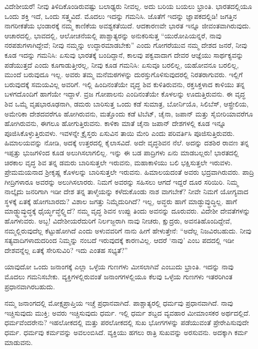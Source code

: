 ವಿದೇಶೀಯರೆ! ನೀವು ತಿಳಿದಿಕೊಂಡಿರುವಷ್ಟು ಬಲಾಢ್ಯರು ನೀವಲ್ಲ. ಅದು ಬರಿಯ ಬಯಲು ಭ್ರಾಂತಿ. ಭಾರತದಲ್ಲಿಯೂ ಒಂದು ಶಕ್ತಿ ಇದೆ, ಒಂದು ಸತ್ತ್ವವಿದೆ. ಮೊದಲು ಇದನ್ನು ಗಮನಿಸಿ. ಜೊತೆಗೆ ಇದನ್ನು ಜ್ಞಾಪಕದಲ್ಲಿಡಿ! ಜಗತ್ತಿನ ನಾಗರೀಕತೆಯ ಭಂಡಾರಕ್ಕೆ ನಮ್ಮ ಕಾಣಿಕೆಯ ಅವಶ್ಯಕತೆಯಿದೆ. ಆದಕಾರಣವೇ ಭಾರತ ಇನ್ನೂ ಜೀವಂತವಾಗಿರುವುದು. ಆಚಾರದಲ್ಲಿ, ಭಾವದಲ್ಲಿ, ಆಲೋಚನೆಯಲ್ಲಿ ಪಾಶ್ಚಾತ್ಯರನ್ನು ಅನುಕರಿಸುತ್ತ “ಯುರೋಪಿ\break ಯನ್ನರೆ, ನಾವು ನರಪಶುಗಳಾಗಿದ್ದೇವೆ; ನೀವು ನಮ್ಮನ್ನು ಉದ್ಧಾರಮಾಡಬೇಕು” ಎಂದು ಗೋಗರೆಯುವ ನಮ್ಮ ದೇಶದ ಜನರೆ, ನೀವು ಕೂಡ ಇದನ್ನು ಗಮನಿಸಿ: ಏಸುವು ಭಾರತಕ್ಕೆ ಬಂದಿದ್ದಾನೆ, ಕಾಲವು ಪಕ್ವವಾದಾಗ ದೇವರ ಆಜ್ಞೆಯು ಸಾರ್ಥಕ್ಯವನ್ನು ಪಡೆಯುತ್ತದೆ ಎಂದು ಕೂಗಾಡುತ್ತೀರಲ್ಲ, ನೀವು ಕೂಡ ಗಮನಿಸಿ: ಏಸುವೂ ಬರಲಿಲ್ಲ, ಯಹೋವನೂ ಬರಲಿಲ್ಲ, ಮುಂದೆ ಬರುವುದೂ ಇಲ್ಲ. ಅವರು ತಮ್ಮ ಮನೆಮಠಗಳನ್ನು ದುರಸ್ತುಗೊಳಿಸು\break ವುದರಲ್ಲಿ ನಿರತರಾಗುವರು. ಇಲ್ಲಿಗೆ ಬರುವುದಕ್ಕೆ ಸಮಯವಿಲ್ಲ ಅವರಿಗೆ. ಇಲ್ಲಿ ಹಿಂದಿನಂತೆಯೇ ವೃದ್ಧ ಶಿವ ಕುಳಿತಿರುವನು, ರಕ್ತಸಿಕ್ತಳಾದ ಕಾಳಿಯು ತನ್ನ ಬಳಗದೊಂದಿಗೆ ಹಾಗೆಯೇ ಇದ್ದಾಳೆ. ವ್ರಜ ಗೋಪಾಲನು ಎಂದಿನಂತೆಯೇ ಕೊಳಲನ್ನು ಊದುತ್ತಿರುವನು. ಈ ವೃದ್ಧ ಶಿವ ಒಮ್ಮೆ ವೃಷಭಾರೂಢನಾಗಿ, ಡಮರು ಬಾರಿಸುತ್ತ ಒಂದು ಕಡೆ ಸುಮಾತ್ರ, ಬೋರ್ನಿಯೊ, ಸಿಲಿಬೆಸ್​, ಆಸ್ಟ್ರೇಲಿಯ, ಅಮೇರಿಕಾ ದೇಶದವರೆಗೂ ಹೋಗಿರುವನು, ಮತ್ತೊಂದು ಕಡೆ ಟಿಬೆಟ್​, ಚೈನಾ, ಜಪಾನ್​ ಮತ್ತು ಸೈಬೀರಿಯಾವರೆಗೂ ಹೋಗಿರುವನು, ಈಗಲೂ ಹೋಗುತ್ತಿರುವನು. ಕಾಳಿಕಾ ಮಾತೆ ಚೈನಾ ಜಪಾನ್​ ದೇಶಗಳಲ್ಲಿ ಕೂಡ ಇನ್ನೂ ಪೂಜಿಸಿಕೊಳ್ಳುತ್ತಿರುವಳು. ಇವಳನ್ನೇ ಕ್ರೈಸ್ತರು ಏಸುವಿನ ತಾಯಿ ಮೇರಿ ಎಂದು ಪರಿವರ್ತಿಸಿ ಪೂಜಿಸುತ್ತಿರುವರು. ಹಿಮಾಲಯವನ್ನು ನೋಡಿ, ಅದಕ್ಕೆ ಉತ್ತರದಲ್ಲಿ ಕೈಲಾಸವಿದೆ. ಅದೇ ವೃದ್ಧಶಿವನ ನೆಲೆ. ಅದನ್ನು ದಶಶಿರ ರಾವಣ ತನ್ನ ಇಪ್ಪತ್ತು ಭುಜಗಳಿಂದ ಕೂಡ ಅಲುಗಿಸಲಾಗ\break ಲಿಲ್ಲ. ಇನ್ನು ಈ ಬಡ ಪಾದ್ರಿಗಳು ಏನು ಮಾಡಬಲ್ಲರು! ಭಾರತದಲ್ಲಿ ಚಿರಕಾಲ ವೃದ್ಧ ಶಿವ ತನ್ನ ಡಮರು ಬಾರಿಸುತ್ತಲೇ ಇರುವನು, ಮಹಾಕಾಳಿಯು ಬಲಿ ಭಕ್ಷಿಸುತ್ತಲೇ ಇರುವಳು. ಪ್ರೇಮಮಯನಾದ ಶ‍್ರೀಕೃಷ್ಣ ಕೊಳಲನ್ನು ಬಾರಿಸುತ್ತಲೇ ಇರುವನು. ಹಿಮಾಲಯದಂತೆ ಅವರು ಭದ್ರವಾಗಿರುವರು. ಪಾದ್ರಿ ಗೀದ್ರಿಗಳಾರೂ ಅವರನ್ನು ಅಲುಗಿಸಲಾರರು. ನಿಮಗೆ ಅವರನ್ನು ಸಹಿಸಲು ಆಗದೆ ಇದ್ದರೆ ದೂರ ಸರಿಯಿರಿ. ನಿಮ್ಮ ನಾಲ್ಕೈದು ಜನರಿಗಾಗಿ ಇಡೀ ದೇಶ ತನ್ನ ತಾಳ್ಮೆಯನ್ನು ಕಳೆದುಕೊಂಡು ನಾಶ ವಾಗಬೇಕೆ? ನೀವೇ ನಿಮಗೆ ಯೋಗ್ಯವಾದ ಸ್ಥಳಕ್ಕೆ ಏತಕ್ಕೆ ಹೋಗಬಾರದು? ವಿಶಾಲ ಜಗತ್ತು ನಿಮ್ಮೆದುರಿಗಿದೆ? ಇಲ್ಲ, ಅವ್ಧರು ಹಾಗೆ ಮಾಡ್ಧುವ್ಧುದ್ಧಿಲ್ಲ. ಹಾಗೆ ಮಾಡ್ಧ್ಧುವ್ಧುದ್ಧಕ್ಕೆ ಧೈರ್ಯ್ಧವ್ಧೆಲ್ಲ್ಧಿದೆ? ನಮ್ಮ ವೃದ್ಧ ಶಿವನ ಉಪ್ಪು ತಿಂದು ಅವನನ್ನು ದೂರುವರು. ವಿದೇಶೀ ದೇವತೆಗಳನ್ನು ಹೊಗಳುವರು. ಅಬ್ಬ! ವಿದೇಶೀಯರೆದುರಿಗೆ ನಿರ್ಲಜ್ಜರಾಗಿ ನಾವು ನೀಚರು, ಕ್ಷುದ್ರರು, ಅವನತಿಹೊಂದಿದ್ದೇವೆ, ನಮ್ಮಲ್ಲಿರುವುದೆಲ್ಲ ಕೆಟ್ಟುಹೋಗಿದೆ ಎಂದು ಅಳುವವರಿಗೆ ನಾನು ಹೀಗೆ ಹೇಳುತ್ತೇನೆ: “ಅದೆಲ್ಲ ನಿಜವಿರಬಹುದು. ನೀವು ಸತ್ಯವಾದಿಗಳಾದುದರಿಂದ ನಿಮ್ಮನ್ನು ನಂಬದೆ ಇರುವುದಕ್ಕೆ ಕಾರಣವಿಲ್ಲ. ಆದರೆ ‘ನಾವು’ ಎಂಬ ಪದದಲ್ಲಿ ಇಡೀ ದೇಶವನ್ನೆಲ್ಲ ಏತಕ್ಕೆ ಸೇರಿಸುವಿರಿ? ಇದು ಎಂತಹ ಸಭ್ಯತೆ?”

ಯಾವುದೋ ಒಂದು ಜನಾಂಗಕ್ಕೆ ಎಲ್ಲಾ ಒಳ್ಳೆಯ ಗುಣಗಳು ಮೀಸಲಾಗಿವೆ ಎಂಬುದು ಭ್ರಾಂತಿ. ಇದನ್ನು ನಾವು ಮೊದಲು ಗಮನಿಸಬೇಕು. ವ್ಯಕ್ತಿಗಳಲ್ಲಿರುವಂತೆ ಜನಾಂಗಗಳಲ್ಲಿಯೂ ಕೆಲವು ಒಳ್ಳೆಯ ಗುಣಗಳು ಇತರರಿಗಿಂತ ಪ್ರಧಾನವಾಗಿರಬಹುದು.

ನಮ್ಮ ಜನಾಂಗದಲ್ಲಿ ಮೋಕ್ಷಪ್ರಾಪ್ತಿಯ ಇಚ್ಚೆ ಪ್ರಧಾನವಾಗಿದೆ. ಪಾಶ್ಚಾತ್ಯರಲ್ಲಿ ಧರ್ಮವು ಪ್ರಧಾನವಾಗಿದೆ. ನಾವು ಇಚ್ಚಿಸುವುದು ಮುಕ್ತಿ; ಅವರು ಇಚ್ಚಿಸುವುದು ಧರ್ಮ. ಇಲ್ಲಿ ಧರ್ಮ ಶಬ್ದದ ವ್ಯವಹಾರ ಮೀಮಾಂಸಕರ ಅರ್ಥದಲ್ಲಿದೆ. ಧರ್ಮವೆಂದರೇನು? ಇಹಲೋಕದಲ್ಲಿ ಮತ್ತು ಪರಲೋಕದಲ್ಲಿ ಸುಖ ಭೋಗಗಳನ್ನು ಪಡೆಯುವಂತೆ ಪ್ರೇರೇಪಿಸುವುದೇ ಧರ್ಮ. ಧರ್ಮವು ಕರ್ಮವನ್ನು ಅವಲಂಬಿಸಿದೆ. ವ್ಯಕ್ತಿಯು ಹಗಲು ರಾತ್ರಿ ಸುಖವನ್ನು ಅರಸುವನು. ಅದಕ್ಕಾಗಿ ಕರ್ಮ ಮಾಡುವನು.

